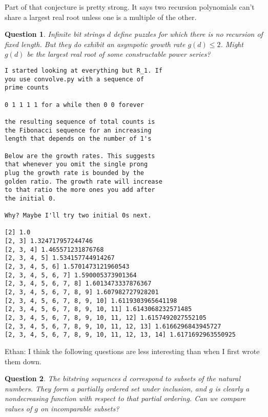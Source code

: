 \documentclass[10pt]{article}
\newtheorem{question}{Question}
\numberwithin{equation}{section}
\newenvironment{anote}
               {{\textcolor{blue}{Note:}}
                 \itshape
               }
               {}
\begin{document}
  \begin{anote}
Part of that conjecture is pretty strong. It says two recursion
polynomials can't share a largest real root unless one is a multiple
of the other.
\end{anote}

  \begin{question}
Infinite bit strings $d$ define puzzles for which there is no
recursion of fixed length. But they do exhibit an asympotic growth
rate $g(d) \le 2$. Might $g(d)$ be the largest real root of some
constructable power series?
  \end{question}
  
  \begin{verbatim}
I started looking at everything but R_1. If
you use convolve.py with a sequence of
prime counts

0 1 1 1 1 for a while then 0 0 forever

the resulting sequence of total counts is
the Fibonacci sequence for an increasing
length that depends on the number of 1's

Below are the growth rates. This suggests
that whenever you omit the single prong
plug the growth rate is bounded by the
golden ratio. The growth rate will increase
to that ratio the more ones you add after
the initial 0.

Why? Maybe I'll try two initial 0s next.

[2] 1.0
[2, 3] 1.324717957244746
[2, 3, 4] 1.465571231876768
[2, 3, 4, 5] 1.534157744914267
[2, 3, 4, 5, 6] 1.5701473121960543
[2, 3, 4, 5, 6, 7] 1.590005373901364
[2, 3, 4, 5, 6, 7, 8] 1.6013473337876367
[2, 3, 4, 5, 6, 7, 8, 9] 1.607982727928201
[2, 3, 4, 5, 6, 7, 8, 9, 10] 1.6119303965641198
[2, 3, 4, 5, 6, 7, 8, 9, 10, 11] 1.6143068232571485
[2, 3, 4, 5, 6, 7, 8, 9, 10, 11, 12] 1.6157492027552105
[2, 3, 4, 5, 6, 7, 8, 9, 10, 11, 12, 13] 1.6166296843945727
[2, 3, 4, 5, 6, 7, 8, 9, 10, 11, 12, 13, 14] 1.6171692963550925
  \end{verbatim}
  \begin{anote}
Ethan: I think the following questions are less interesting than when
I first wrote them down.
\end{anote}
\begin{question}
The bitstring sequences $d$ correspond to subsets of the natural
numbers. They form a partially ordered set under inclusion, and $g$ is
clearly a nondecreasing function with respect to that partial
ordering.  Can we compare values of $g$ on incomparable subsets? 
\end{question}
 
\end{document}
